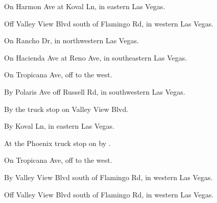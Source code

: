 

\begin{LocationList}

On Harmon Ave at Koval Ln, in eastern Las Vegas.

Off Valley View Blvd south of Flamingo Rd, in western Las Vegas.

On Rancho Dr, in northwestern Las Vegas.

On Hacienda Ave at Reno Ave, in southeastern Las Vegas.

On Tropicana Ave, off   to the west.

By Polaris Ave off Russell Rd, in southwestern Las Vegas.

\Location{\GarageHQ \Garage}
By the truck stop on Valley View Blvd.

By Koval Ln, in eastern Las Vegas.

At the Phoenix truck stop on  by  .

\Location{\RecruitmentAgency \Recruitment}
On Tropicana Ave, off   to the west.

By Valley View Blvd south of Flamingo Rd, in western Las Vegas.

Off Valley View Blvd south of Flamingo Rd, in western Las Vegas.

\end{LocationList}

